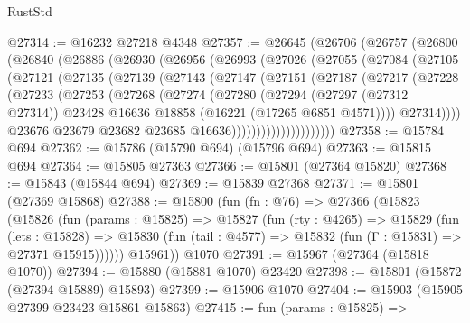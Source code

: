 \begin{lexlean}{RustStd}
\begin{coremodule}
@27314 := @16232 @27218 @4348
@27357 := @26645
    (@26706
      (@26757
        (@26800
          (@26840
            (@26886
              (@26930
                (@26956
                  (@26993
                    (@27026
                      (@27055
                        (@27084
                          (@27105
                            (@27121
                              (@27135
                                (@27139
                                  (@27143
                                    (@27147
                                      (@27151
                                        (@27187
                                          (@27217
                                            (@27228
                                              (@27233
                                                (@27253
                                                  (@27268
                                                    (@27274
                                                      (@27280
                                                        (@27294
                                                          (@27297 (@27312 @27314))
                                                          @23428
                                                          @16636
                                                          @18858
                                                          (@16221 (@17265 @6851 @4571))))
                                                      @27314))))
                                              @23676
                                              @23679
                                              @23682
                                              @23685
                                              @16636)))))))))))))))))))))
@27358 := @15784 @694
@27362 := @15786 (@15790 @694) (@15796 @694)
@27363 := @15815 @694
@27364 := @15805 @27363
@27366 := @15801 (@27364 @15820)
@27368 := @15843 (@15844 @694)
@27369 := @15839 @27368
@27371 := @15801 (@27369 @15868)
@27388 := @15800
    (fun (fn : @76) =>
    @27366
      (@15823
        (@15826
          (fun (params : @15825) =>
          @15827
            (fun (rty : @4265) =>
            @15829
              (fun (lets : @15828) =>
              @15830 (fun (tail : @4577) => @15832 (fun (Γ : @15831) => @27371 @15915))))))
        @15961))
    @1070
@27391 := @15967 (@27364 (@15818 @1070))
@27394 := @15880 (@15881 @1070) @23420
@27398 := @15801 (@15872 (@27394 @15889) @15893)
@27399 := @15906 @1070
@27404 := @15903 (@15905 @27399 @23423 @15861 @15863)
@27415 := fun (params : @15825) =>

\end{coremodule}
\end{lexlean}
